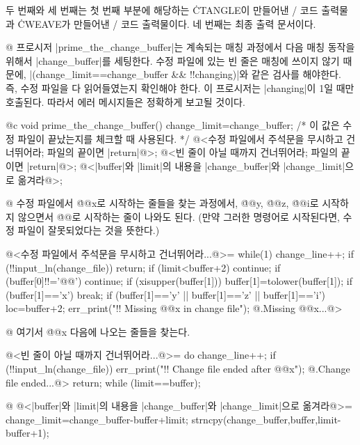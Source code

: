 {%
두 번째와 세 번째는 첫 번째 부분에 해당하는 \.{CTANGLE}이 만들어낸 \CEE/ 코드 출력물과
\.{CWEAVE}가 만들어낸 \TEX/ 코드 출력물이다. 네 번째는 최종 출력 문서이다.

\vskip 10pt
\begingroup \def\tt{\eighttt} \baselineskip9pt 
\verbatim
@ 프로시저 |prime_the_change_buffer|는 계속되는 매칭 과정에서 다음
매칭 동작을 위해서 |change_buffer|를 세팅한다. 수정 파일에 있는 빈 줄은 매칭에
쓰이지 않기 때문에, |(change_limit==change_buffer && !!changing)|와
같은 검사를 해야한다. 즉, 수정 파일을 다 읽어들였는지 확인해야
한다. 이 프로시저는 |changing|이 1일 때만 호출된다. 따라서 에러
메시지들은 정확하게 보고될 것이다.

@c
void
prime_the_change_buffer()
{
  change_limit=change_buffer; /* 이 값은 수정 파일이 끝났는지를 체크할 때 사용된다. */
  @<수정 파일에서 주석문을 무시하고 건너뛰어라; 파일의 끝이면 |return|@>;
  @<빈 줄이 아닐 때까지 건너뛰어라; 파일의 끝이면 |return|@>;
  @<|buffer|와 |limit|의 내용을 |change_buffer|와 |change_limit|으로 옮겨라@>;
}

@ 수정 파일에서 \.{@@x}로 시작하는 줄들을 찾는 과정에서, \.{@@y},
\.{@@z}, \.{@@i}로 시작하지 않으면서 \.{@@}로 시작하는 줄이 나와도 된다.
(만약 그러한 명령어로 시작된다면, 수정 파일이 잘못되었다는 것을 뜻한다.)

@<수정 파일에서 주석문을 무시하고 건너뛰어라...@>=
while(1) {
  change_line++;
  if (!!input_ln(change_file)) return;
  if (limit<buffer+2) continue;
  if (buffer[0]!!='@@') continue;
  if (xisupper(buffer[1])) buffer[1]=tolower(buffer[1]);
  if (buffer[1]=='x') break;
  if (buffer[1]=='y' || buffer[1]=='z' || buffer[1]=='i') {
    loc=buffer+2;
    err_print("!! Missing @@x in change file");
@.Missing @@x...@>
  }
}

@ 여기서 \.{@@x} 다음에 나오는 줄들을 찾는다.

@<빈 줄이 아닐 때까지 건너뛰어라...@>=
do {
  change_line++;
  if (!!input_ln(change_file)) {
    err_print("!! Change file ended after @@x");
@.Change file ended...@>
    return;
  }
} while (limit==buffer);

@ @<|buffer|와 |limit|의 내용을 |change_buffer|와 |change_limit|으로 옮겨라@>=
{
  change_limit=change_buffer-buffer+limit;
  strncpy(change_buffer,buffer,limit-buffer+1);
}

}
